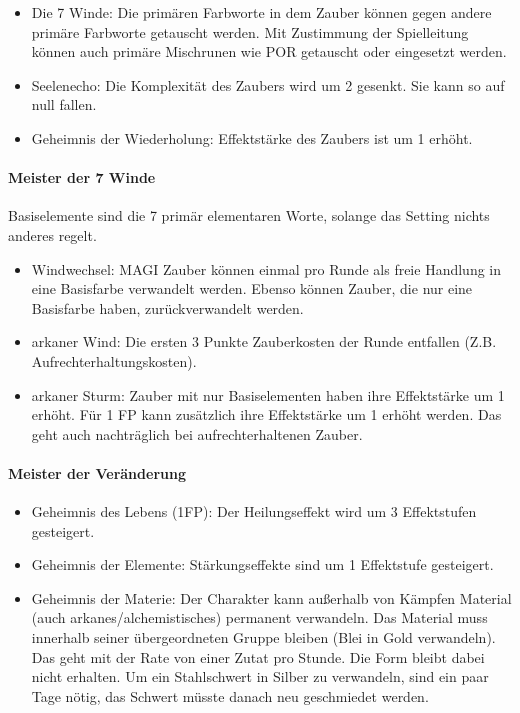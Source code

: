 \documentclass{article}
\begin{document}
\begin{itemize}
\item Die 7 Winde: Die primären Farbworte in dem Zauber können gegen andere primäre Farbworte getauscht werden. Mit Zustimmung der Spielleitung können auch primäre Mischrunen wie POR getauscht oder eingesetzt werden.
\item Seelenecho: Die Komplexität des Zaubers wird um 2 gesenkt. Sie kann so auf null fallen.
\item Geheimnis der Wiederholung: Effektstärke des Zaubers ist um 1 erhöht.
\end{itemize}

\paragraph{Meister der 7 Winde}

Basiselemente sind die 7 primär elementaren Worte, solange das Setting nichts anderes regelt.

\begin{itemize}
\item Windwechsel: MAGI Zauber können einmal pro Runde als freie Handlung in eine Basisfarbe verwandelt werden. Ebenso können Zauber, die nur eine Basisfarbe haben, zurückverwandelt werden.
\item arkaner Wind: Die ersten 3 Punkte Zauberkosten der Runde entfallen (Z.B. Aufrechterhaltungskosten).
\item arkaner Sturm: Zauber mit nur Basiselementen haben ihre Effektstärke um 1 erhöht. Für 1 FP kann zusätzlich ihre Effektstärke um 1 erhöht werden. Das geht auch nachträglich bei aufrechterhaltenen Zauber.
\end{itemize}

\paragraph{Meister der Veränderung}

\begin{itemize}
\item Geheimnis des Lebens (1FP): Der Heilungseffekt wird um 3 Effektstufen gesteigert.
\item Geheimnis der Elemente: Stärkungseffekte sind um 1 Effektstufe gesteigert.
\item Geheimnis der Materie: Der Charakter kann außerhalb von Kämpfen Material (auch arkanes/alchemistisches) permanent verwandeln. Das Material muss innerhalb seiner übergeordneten Gruppe bleiben (Blei in Gold verwandeln). Das geht mit der Rate von einer Zutat pro Stunde. Die Form bleibt dabei nicht erhalten. Um ein Stahlschwert in Silber zu verwandeln, sind ein paar Tage nötig, das Schwert müsste danach neu geschmiedet werden.
\end{itemize}
\end{document}
